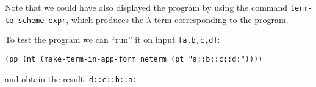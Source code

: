 \documentclass[12pt]{amsart}
\newcommand{\inquotes}[1]{``#1''}
\begin{document}


Note that we could have also displayed the program by using the
command \texttt{term-to-scheme-expr}, which produces the
$\lambda$-term corresponding to the program.

To test the program we can \inquotes{run} it on input \texttt{[a,b,c,d]}:
\begin{verbatim}
(pp (nt (make-term-in-app-form neterm (pt "a::b::c::d:"))))
\end{verbatim}
and obtain the result: \texttt{d::c::b::a:}
\end{document}
